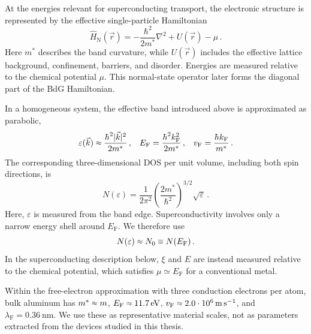             At the energies relevant for superconducting transport, the electronic structure is represented by the effective single-particle Hamiltonian
            \begin{equation}
                \hat{H}_\mathrm{N}(\vec{r})
                = -\frac{\hbar^2}{2m^\ast}\nabla^2
                + U(\vec{r})-\mu\,.
                \label{eq:quasi:normal-hamiltonian}
            \end{equation}
            Here $m^\ast$ describes the band curvature, while $U(\vec r)$ includes the effective lattice background, confinement, barriers, and disorder. Energies are measured relative to the chemical potential $\mu$. This normal-state operator later forms the diagonal part of the BdG Hamiltonian. \cite{gross_festkorperphysik_2014}

            In a homogeneous system, the effective band introduced above is approximated as parabolic,
            \begin{align}
                \varepsilon(\vec{k})
                \sapprox \frac{\hbar^2 \lvert\vec{k}\rvert^2}{2m^\ast}\,,
                &&
                E_\mathrm{F}
                = \frac{\hbar^2 k_\mathrm{F}^2}{2m^\ast}\,,
                &&
                v_\mathrm{F}
                = \frac{\hbar k_\mathrm{F}}{m^\ast}\,.
                \label{eq:micro:normal-dispersion}
            \end{align}
            The corresponding three-dimensional DOS per unit volume, including both spin directions, is
            \begin{equation}
                N(\varepsilon)
                = \frac{1}{2\pi^2}
                \left(\frac{2m^\ast}{\hbar^2}\right)^{3/2}
                \sqrt{\varepsilon}\,.
                \label{eq:micro:normal-dos}
            \end{equation}
            Here, $\varepsilon$ is measured from the band edge. Superconductivity involves only a narrow energy shell around $E_\mathrm{F}$. We therefore use
            \begin{equation}
                N(\varepsilon) \sapprox N_0 \sequiv N(E_\mathrm{F})\,.
                \label{eq:micro:constant-normal-dos}
            \end{equation}
            In the superconducting description below, $\xi$ and $E$ are instead measured relative to the chemical potential, which satisfies $\mu\simeq E_\mathrm{F}$ for a conventional metal.

            Within the free-electron approximation with three conduction electrons per atom, bulk aluminum has $m^\ast\sapprox m$, $E_\mathrm{F}\sapprox\qty{11.7}{\electronvolt}$, $v_\mathrm{F}\sapprox2.0\cdot10^6\,\unit{\meter\per\second}$, and $\lambda_\mathrm{F}=\qty{0.36}{\nano\meter}$. We use these as representative material scales, not as parameters extracted from the devices studied in this thesis. \cite{ashcroft_solid_1976}

